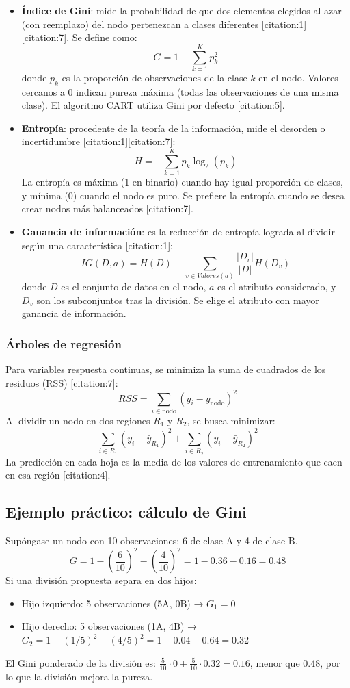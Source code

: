 \documentclass[12pt,a4paper,openany,oneside]{book}
\begin{document}
\begin{itemize}
    \item \textbf{Índice de Gini}: mide la probabilidad de que dos elementos elegidos al azar (con reemplazo) del nodo pertenezcan a clases diferentes [citation:1][citation:7]. Se define como:
    \[
    G = 1 - \sum_{k=1}^{K} p_k^2
    \]
    donde \(p_k\) es la proporción de observaciones de la clase \(k\) en el nodo. Valores cercanos a 0 indican pureza máxima (todas las observaciones de una misma clase). El algoritmo CART utiliza Gini por defecto [citation:5].

    \item \textbf{Entropía}: procedente de la teoría de la información, mide el desorden o incertidumbre [citation:1][citation:7]:
    \[
    H = -\sum_{k=1}^{K} p_k \log_2(p_k)
    \]
    La entropía es máxima (1 en binario) cuando hay igual proporción de clases, y mínima (0) cuando el nodo es puro. Se prefiere la entropía cuando se desea crear nodos más balanceados [citation:7].

    \item \textbf{Ganancia de información}: es la reducción de entropía lograda al dividir según una característica [citation:1]:
    \[
    IG(D, a) = H(D) - \sum_{v \in Valores(a)} \frac{|D_v|}{|D|} H(D_v)
    \]
    donde \(D\) es el conjunto de datos en el nodo, \(a\) es el atributo considerado, y \(D_v\) son los subconjuntos tras la división. Se elige el atributo con mayor ganancia de información.
\end{itemize}

\subsubsection{Árboles de regresión}
Para variables respuesta continuas, se minimiza la suma de cuadrados de los residuos (RSS) [citation:7]:
\[
RSS = \sum_{i \in \text{nodo}} (y_i - \bar{y}_{\text{nodo}})^2
\]
Al dividir un nodo en dos regiones \(R_1\) y \(R_2\), se busca minimizar:
\[
\sum_{i \in R_1} (y_i - \bar{y}_{R_1})^2 + \sum_{i \in R_2} (y_i - \bar{y}_{R_2})^2
\]
La predicción en cada hoja es la media de los valores de entrenamiento que caen en esa región [citation:4].

\subsection{Ejemplo práctico: cálculo de Gini}
Supóngase un nodo con 10 observaciones: 6 de clase A y 4 de clase B.
\[
G = 1 - \left(\frac{6}{10}\right)^2 - \left(\frac{4}{10}\right)^2 = 1 - 0.36 - 0.16 = 0.48
\]
Si una división propuesta separa en dos hijos:
\begin{itemize}
    \item Hijo izquierdo: 5 observaciones (5A, 0B) → \(G_1 = 0\)
    \item Hijo derecho: 5 observaciones (1A, 4B) → \(G_2 = 1 - (1/5)^2 - (4/5)^2 = 1 - 0.04 - 0.64 = 0.32\)
\end{itemize}
El Gini ponderado de la división es: \(\frac{5}{10} \cdot 0 + \frac{5}{10} \cdot 0.32 = 0.16\), menor que 0.48, por lo que la división mejora la pureza.
\end{document}
